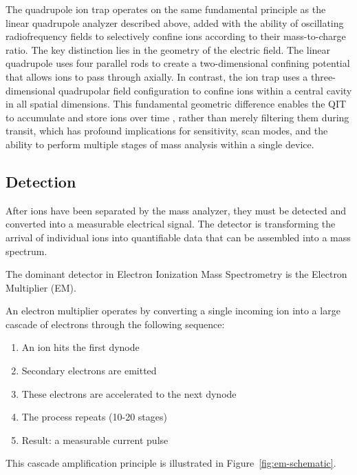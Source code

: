 The quadrupole ion trap operates on the same fundamental principle as the linear quadrupole analyzer described above, added with the ability of oscillating radiofrequency fields to selectively confine ions according to their mass-to-charge ratio. \cite[p.~1156]{Raffaelli2021}
The key distinction lies in the geometry of the electric field.
The linear quadrupole uses four parallel rods to create a two-dimensional confining potential that allows ions to pass through axially.
In contrast, the ion trap uses a three-dimensional quadrupolar field configuration to confine ions within a central cavity in all spatial dimensions. \cite[p.~962]{March2009}
This fundamental geometric difference enables the QIT to accumulate and store ions over time \cite[p.~973]{March2009}, rather than merely filtering them during transit, which has profound implications for sensitivity, scan modes, and the ability to perform multiple stages of mass analysis within a single device. \cite[p.~984]{March2009}


\subsection{Detection}

After ions have been separated by the mass analyzer, they must be detected and converted into a measurable electrical signal. \cite[pp.~5-6]{Dass2007}
The detector is transforming the arrival of individual ions into quantifiable data that can be assembled into a mass spectrum. \cite[p.~103]{Dass2007}

The dominant detector in Electron Ionization Mass Spectrometry is the Electron Multiplier (EM).
\cite[pp.~103--104]{Dass2007}

An electron multiplier operates by converting a single incoming ion into a large cascade of electrons through the following sequence:

\begin{enumerate}
    \item An ion hits the first dynode
    \item Secondary electrons are emitted
    \item These electrons are accelerated to the next dynode
    \item The process repeats (10-20 stages)
    \item Result: a measurable current pulse
\end{enumerate}

This cascade amplification principle is illustrated in Figure~\ref{fig:em-schematic}.


